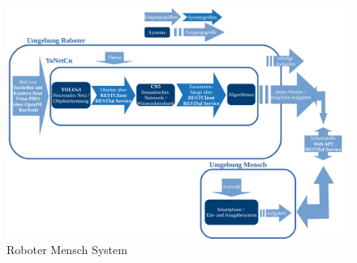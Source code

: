 \begin{figure}[h]
	
	\begin{center}
		
		\includegraphics[width=16cm]{images/Masteridee_4.png}
		
		\caption{Roboter Mensch System}
		
		\label{Roboter_Mensch_System}
		
	\end{center}
	
	
\end{figure}



